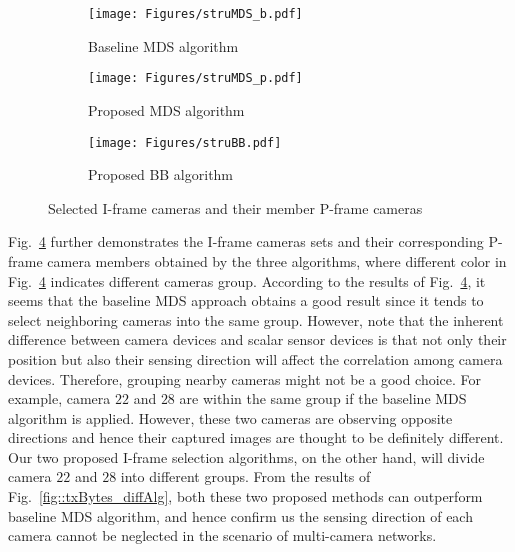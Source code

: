 %
\begin{figure}
\begin{center}
\begin{subfigure}[b]{\columnwidth}
\texttt{[image: Figures/struMDS\_b.pdf]}
\caption{\label{fig::refStructure_MDSbaseline} Baseline MDS algorithm}
\end{subfigure}
\begin{subfigure}[b]{\columnwidth}
\texttt{[image: Figures/struMDS\_p.pdf]}
\caption{\label{fig::refStructure_MDSproposed} Proposed MDS algorithm}
\end{subfigure}
\begin{subfigure}[b]{\columnwidth}
\texttt{[image: Figures/struBB.pdf]}
\caption{\label{fig::refStructure_BB} Proposed BB algorithm}
\end{subfigure}
\caption{\label{fig::refStructure_threeAlgs} Selected I-frame cameras and their member P-frame cameras}
\end{center}
\end{figure}
%
Fig.~\ref{fig::refStructure_threeAlgs} further demonstrates the I-frame cameras sets and their corresponding P-frame camera members obtained by the three algorithms, where different color in Fig.~\ref{fig::refStructure_threeAlgs} indicates different cameras group.
According to the results of Fig.~\ref{fig::refStructure_threeAlgs}, it seems that the baseline MDS approach obtains a good result since it tends to select neighboring cameras into the same group.
However, note that the inherent difference between camera devices and scalar sensor devices is that not only their position but also their sensing direction will affect the correlation among camera devices.
Therefore, grouping nearby cameras might not be a good choice.
For example, camera $22$ and $28$ are within the same group if the baseline MDS algorithm is applied.
However, these two cameras are observing opposite directions and hence their captured images are thought to be definitely different.
Our two proposed I-frame selection algorithms, on the other hand, will divide camera $22$ and $28$ into different groups.
From the results of Fig.~\ref{fig::txBytes_diffAlg}, both these two proposed methods can outperform baseline MDS algorithm, and hence confirm us the sensing direction of each camera cannot be neglected in the scenario of multi-camera networks.



